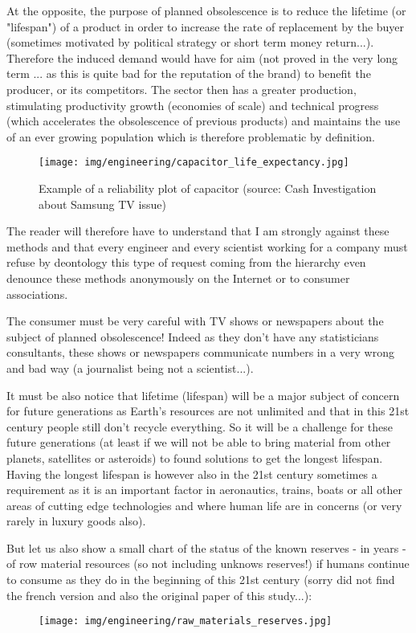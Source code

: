 	At the opposite, the purpose of planned obsolescence is to reduce the lifetime (or "lifespan") of a product in order to increase the rate of replacement by the buyer (sometimes motivated by political strategy or short term  money return...). Therefore the induced demand would have for aim (not proved in the very long term ... as this is quite bad for the reputation of the brand) to benefit the producer, or its competitors. The sector then has a greater production, stimulating productivity growth (economies of scale) and technical progress (which accelerates the obsolescence of previous products) and maintains the use of an ever growing population which is therefore problematic by definition.
	\begin{figure}[H]
		\centering
		\texttt{[image: img/engineering/capacitor\_life\_expectancy.jpg]}
		\caption[Example of a reliability plot of capacitor]{Example of a reliability plot of capacitor (source: Cash Investigation about Samsung TV issue) }
	\end{figure}
	The reader will therefore have to understand that I am strongly against these methods and that every engineer and every scientist working for a company must refuse by deontology this type of request coming from the hierarchy even denounce these methods anonymously on the Internet or to consumer associations.
	\begin{tcolorbox}[title=Remark,colframe=black,arc=10pt]
	The consumer must be very careful with TV shows or newspapers about the subject of planned obsolescence! Indeed as they don't have any statisticians consultants, these shows or newspapers communicate numbers in a very wrong and bad way (a journalist being not a scientist...).
	\end{tcolorbox}
		
	It must be also notice that lifetime (lifespan) will be a major subject of concern for future generations as Earth's resources are not unlimited and that in this 21st century people still don't recycle everything. So it will be a challenge for these future generations (at least if we will not be able to bring material from other planets, satellites or asteroids) to found solutions to get the longest lifespan. Having the longest lifespan is however also in the 21st century sometimes a requirement as it is an important factor in aeronautics, trains, boats or all other areas of cutting edge technologies and where human life are in concerns (or very rarely in luxury goods also).

	But let us also show a small chart of the status of the known reserves - in years - of row material resources (so not including unknows reserves!) if humans continue to consume as they do in the beginning of this 21st century (sorry did not find the french version and also the original paper of this study...):
	\begin{figure}[H]
		\centering
		\texttt{[image: img/engineering/raw\_materials\_reserves.jpg]}
	\end{figure}
		
